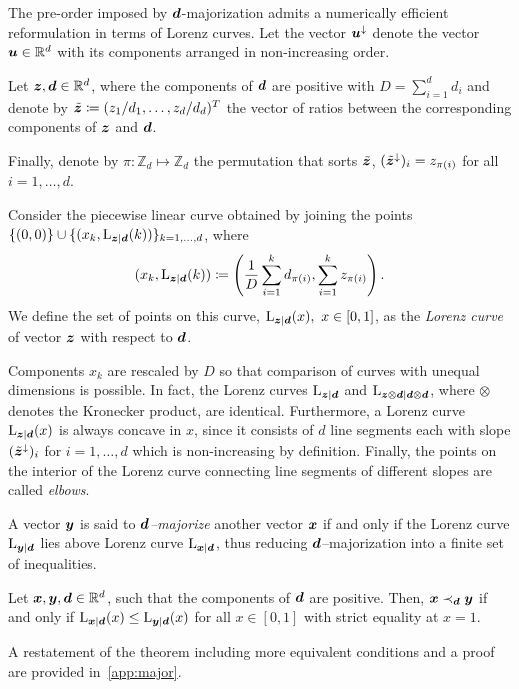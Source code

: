 \documentclass[pra,
aps,
twocolumn,
superscriptaddress,
groupedaddress,
nofootinbib,
reprint
]{revtex4-1}
\begin{document}
The pre-order imposed by $\bm{d}$-majorization admits a numerically efficient reformulation in terms of Lorenz curves.
Let the vector $\bm{u}^\downarrow$ denote the vector $\bm{u} \in \mathbb{R}^d$ with its components arranged in non-increasing order.
\begin{definition}\label{def:lc}
    Let $\bm{z}, \bm{d} \in \mathbb{R}^d$, where the components of $\bm{d}$ are positive with $D = \sum_{i=1}^d d_i$ and denote by $\tilde{\bm{z}} \coloneqq (z_1/d_1, \dots, z_d/d_d)^T$ the vector of ratios between the corresponding components of $\bm{z}$ and $\bm{d}$.
    
    Finally, denote by $\pi: \mathbb{Z}_d \mapsto \mathbb{Z}_d$ the permutation that sorts $\tilde{\bm{z}}$, $(\tilde{\bm{z}}^\downarrow)_i = z_{\pi(i)}$ for all $i=1,\dots,d$.
    
    Consider the piecewise linear curve obtained by joining the points $\{(0,0)\} \cup \{ (x_k, {{\rm{L}}_{\bm{z}|\bm{d}}}(k)) \}_{k=1,\dots,d}$, where
    \begin{equation}\label{eq:lorenz}
        (x_k, {{\rm{L}}_{\bm{z}|\bm{d}}}(k)) \coloneqq \left( \frac{1}{D}\sum_{i=1}^k d_{\pi(i)}, \sum_{i=1}^k z_{\pi(i)} \right).
    \end{equation}
    We define the set of points on this curve, ${{\rm{L}}_{\bm{z}|\bm{d}}}(x),\ x \in [0,1]$, as the \emph{Lorenz curve} of vector $\bm{z}$ with respect to $\bm{d}$.
\end{definition}
Components $x_k$ are rescaled by $D$ so that comparison of curves with unequal dimensions is possible.
In fact, the Lorenz curves ${{\rm{L}}_{\bm{z}|\bm{d}}}$ and ${{\rm{L}}_{\bm{z} \otimes \bm{d}|\bm{d} \otimes \bm{d}}}$, where $\otimes$ denotes the Kronecker product, are identical.
Furthermore, a Lorenz curve ${{\rm{L}}_{\bm{z}|\bm{d}}}(x)$ is always concave in $x$, since it consists of $d$ line segments each with slope $(\tilde{\bm{z}}^\downarrow)_i$ for $i=1,\dots,d$ which is non-increasing by definition.
Finally, the points on the interior of the Lorenz curve connecting line segments of different slopes are called \emph{elbows}.

A vector $\bm{y}$ is said to \emph{$\bm{d}$--majorize} another vector $\bm{x}$ if and only if the Lorenz curve ${{\rm{L}}_{\bm{y}|\bm{d}}}$ lies above Lorenz curve ${{\rm{L}}_{\bm{x}|\bm{d}}}$, thus reducing $\bm{d}$--majorization into a finite set of inequalities.
\begin{theorem}\label{thm:dmajor}
    Let $\bm{x}, \bm{y}, \bm{d} \in \mathbb{R}^d$, such that the components of $\bm{d}$ are positive. 
    Then, $\bm{x} \prec_{\bm{d}} \bm{y}$ if and only if ${{\rm{L}}_{\bm{x}|\bm{d}}}(x) \leq {{\rm{L}}_{\bm{y}|\bm{d}}}(x)$ for all $x \in [0,1]$ with strict equality at $x=1$.
\end{theorem}
A restatement of the theorem including more equivalent conditions and a proof are provided in~\cref{app:major}.
	
\end{document}
